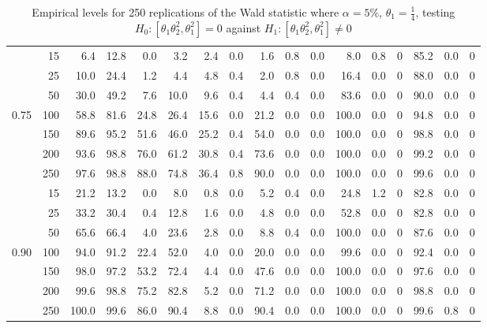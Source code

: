 \documentclass[]{article}\usepackage[]{graphicx}\usepackage[]{color}
\begin{document}
\begin{table}[H]
{\begin{tabular}{|r|r|r|r|r|r|r|r|r|r|r|r|r|r|r|r|r|}
			\hline
			& 15 & 6.4 & 12.8 & 0.0 & 3.2 & 2.4 & 0.0 & 1.6 & 0.8 & 0.0 & 8.0 & 0.8 & 0 & 85.2 & 0.0 & 0 \\
			& 25 & 10.0 & 24.4 & 1.2 & 4.4 & 4.8 & 0.4 & 2.0 & 0.8 & 0.0 & 16.4 & 0.0 & 0 & 88.0 & 0.0 & 0 \\
			& 50 & 30.0 & 49.2 & 7.6 & 10.0 & 9.6 & 0.4 & 4.4 & 0.4 & 0.0 & 83.6 & 0.0 & 0 & 90.0 & 0.0 & 0 \\
			0.75 & 100 & 58.8 & 81.6 & 24.8 & 26.4 & 15.6 & 0.0 & 21.2 & 0.0 & 0.0 & 100.0 & 0.0 & 0 & 94.8 & 0.0 & 0 \\
			& 150 & 89.6 & 95.2 & 51.6 & 46.0 & 25.2 & 0.4 & 54.0 & 0.0 & 0.0 & 100.0 & 0.0 & 0 & 98.8 & 0.0 & 0 \\
			& 200 & 93.6 & 98.8 & 76.0 & 61.2 & 30.8 & 0.4 & 73.6 & 0.0 & 0.0 & 100.0 & 0.0 & 0 & 99.2 & 0.0 & 0 \\
			& 250 & 97.6 & 98.8 & 88.0 & 74.8 & 36.4 & 0.8 & 90.0 & 0.0 & 0.0 & 100.0 & 0.0 & 0 & 99.6 & 0.0 & 0 \\
			\hline
			& 15 & 21.2 & 13.2 & 0.0 & 8.0 & 0.8 & 0.0 & 5.2 & 0.4 & 0.0 & 24.8 & 1.2 & 0 & 82.8 & 0.0 & 0 \\
			& 25 & 33.2 & 30.4 & 0.4 & 12.8 & 1.6 & 0.0 & 4.8 & 0.0 & 0.0 & 52.8 & 0.0 & 0 & 82.8 & 0.0 & 0 \\
			& 50 & 65.6 & 66.4 & 4.0 & 23.6 & 2.8 & 0.0 & 8.8 & 0.4 & 0.0 & 100.0 & 0.0 & 0 & 87.6 & 0.0 & 0 \\
			0.90 & 100 & 94.0 & 91.2 & 22.4 & 52.0 & 4.0 & 0.0 & 20.0 & 0.0 & 0.0 & 99.6 & 0.0 & 0 & 92.4 & 0.0 & 0 \\
			& 150 & 98.0 & 97.2 & 53.2 & 72.4 & 4.4 & 0.0 & 47.6 & 0.0 & 0.0 & 100.0 & 0.0 & 0 & 97.6 & 0.0 & 0 \\
			& 200 & 99.6 & 98.8 & 75.2 & 82.8 & 5.2 & 0.0 & 71.2 & 0.0 & 0.0 & 100.0 & 0.0 & 0 & 98.8 & 0.0 & 0 \\
			& 250 & 100.0 & 99.6 & 86.0 & 90.4 & 8.8 & 0.0 & 90.4 & 0.0 & 0.0 & 100.0 & 0.0 & 0 & 99.6 & 0.8 & 0 \\
			\hline
		\end{tabular}
	}
	\caption{Empirical levels for 250 replications of the Wald statistic where $\alpha = 5\%$, $\theta_1=\frac{1}{4}$, testing $H_0: \left[ \theta_1\theta_2^2, \theta_1^2\right] =0$ against $H_1: \left[ \theta_1\theta_2^2, \theta_1^2\right] \neq 0$}
	\label{tbl:W:14}
\end{table}
\end{document}
